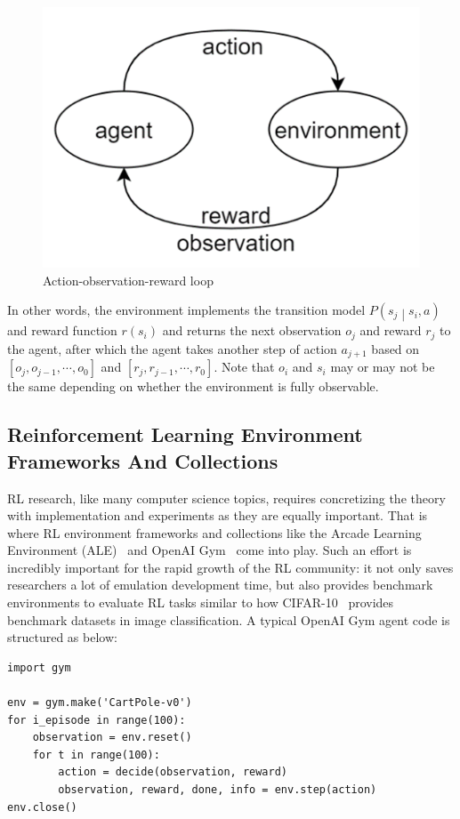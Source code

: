 \documentclass[fyp]{socreport}
\newenvironment{code}{\captionsetup{type=listing}}{}
\begin{document}
\begin{figure}[htp]
    \centering
    \includegraphics{images/obr-loop.png}
    \caption{Action-observation-reward loop}
    \label{fig:obr-loop}
\end{figure}

In other words, the environment implements the transition model $P\left(s_j\middle| s_i,a\right)$ and reward function $r\left(s_i\right)$ and returns the next observation $o_j$ and reward $r_j$ to the agent, after which the agent takes another step of action $a_{j+1}$ based on $\left[o_j,o_{j-1},\cdots,o_0\right]$ and $\left[r_j,r_{j-1},\cdots,r_0\right]$. Note that $o_i$ and $s_i$ may or may not be the same depending on whether the environment is fully observable.

\subsection{Reinforcement Learning Environment Frameworks And Collections}
RL research, like many computer science topics, requires concretizing the theory with implementation and experiments as they are equally important. That is where RL environment frameworks and collections like the Arcade Learning Environment (ALE)~\cite{ale} and OpenAI Gym~\cite{openai-gym} come into play. Such an effort is incredibly important for the rapid growth of the RL community: it not only saves researchers a lot of emulation development time, but also provides benchmark environments to evaluate RL tasks similar to how CIFAR-10~\cite{cifar-10} provides benchmark datasets in image classification. A typical OpenAI Gym agent code is structured as below:

\begin{code}
\begin{verbatim}
import gym

env = gym.make('CartPole-v0')
for i_episode in range(100):
    observation = env.reset()
    for t in range(100):
        action = decide(observation, reward)
        observation, reward, done, info = env.step(action)
env.close()
\end{verbatim}
\label{code:gym-agent}
\end{code}
\end{document}
